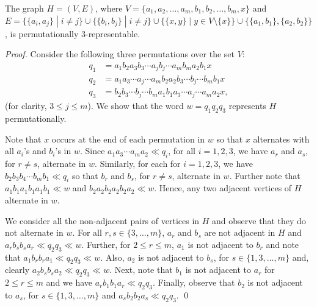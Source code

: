\documentclass{llncs}
\begin{document}
\begin{lemma}\label{H}
	The graph $H = (V, E)$, where $V  = \{a_1,a_2, \ldots, a_m, b_1,b_2, \ldots , b_m, x\}$ and $E = \Big\{\{a_i,a_j\}\; |\; i \ne j\Big\} \cup \Big\{\{b_i, b_j\}\; |\; i \ne j\Big\} \cup \Big\{\{x, y\}\; |\; y \in V \setminus \{x\} \Big\} \cup \Big\{\{a_1, b_1\}, \{a_2, b_2\}\Big\}$, is permutationally 3-representable.  
\end{lemma}

\begin{proof}
	Consider the following three permutations over the set $V$:
	\begin{align*}
		q_1 &= a_1 b_2 a_3 b_3 \cdots a_j b_j \cdots a_m b_m a_2 b_1x\\
		q_2 &= a_1 a_3 \cdots a_j \cdots a_m b_2 a_2 b_3 \cdots b_j \cdots b_m b_1x\\
		q_3 &= b_2 b_3 \cdots b_j \cdots b_m a_1 b_1 a_3 \cdots a_j \cdots a_m a_2x, 
	\end{align*} (for clarity, $3 \le j \le m$).	
	We show that the word $w = q_1q_2q_3$ represents $H$ permutationally. 
	
	Note that $x$ occurs at the end of each permutation in $w$ so that $x$ alternates with all $a_i$'s and $b_i$'s in $w$. Since $a_1 a_3\cdots a_m a_2 \ll q_i$, for all $i = 1, 2, 3$, we have $a_r$ and $a_s$, for $r \ne s$, alternate in $w$. Similarly, for each for $i = 1, 2, 3$, we have $b_2 b_3 b_4 \cdots b_m b_1\ll q_i$ so that $b_r$ and $b_s$, for $r \ne s$, alternate in $w$. Further note that $a_1b_1a_1b_1a_1b_1 \ll w$ and $b_2a_2b_2a_2b_2a_2 \ll w$. Hence, any two adjacent vertices of $H$ alternate in $w$. 
	
	We consider all the non-adjacent pairs of vertices in $H$ and observe that they do not alternate in $w$.  For all $r, s \in \{3, \ldots, m\}$, $a_r$ and $b_s$ are not adjacent in $H$ and $a_rb_sb_s a_r \ll q_2 q_3 \ll w$.  
	Further, for $2 \le r \le m$, $a_1$ is not adjacent to $b_r$ and note that $a_1 b_r b_r a_1 \ll q_2 q_3 \ll w$. Also,  $a_2$ is not adjacent to $b_s$, for $s \in \{1,3,\ldots, m\}$ and,  clearly $a_2 b_s b_s a_2 \ll q_2 q_3 \ll w$.  Next,
	note that $b_1$ is not adjacent to $a_r$ for $2 \le r \le m$ and we have $a_rb_1b_1 a_r \ll q_2 q_3$. Finally, observe that $b_2$ is not adjacent to $a_s$, for $s \in \{1,3,\ldots,m\}$ and $a_sb_2b_2a_s \ll q_2 q_3$. \qed
\end{proof}
\end{document}
